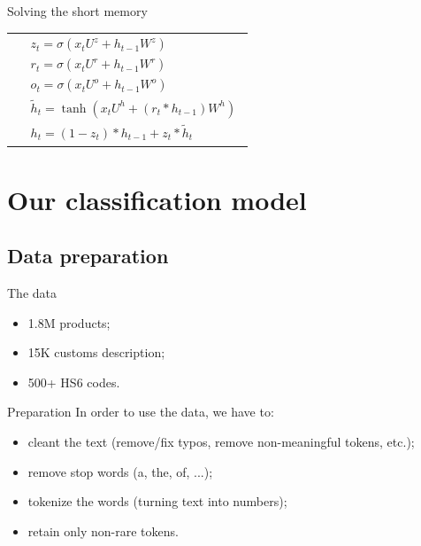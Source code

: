 \documentclass[9pt]{beamer}
\begin{document}
\begin{frame}{Solving the short memory}
{\begin{center}
\begin{tabular}{ c  m{5cm} }
				& $$
					\begin{array}{l} 
						z_t = \sigma\left( x_t U^z + h_{t-1} W^z\right) \\
						r_t = \sigma\left( x_t U^r + h_{t-1} W^r\right) \\
						o_t = \sigma\left( x_t U^o + h_{t-1} W^o\right) \\
						\widetilde{h}_t = \tanh \left( x_t U^h +(r_t \ast h_{t-1}) W^h \right)\\
						h_t =  \left( 1-z_t \right) \ast h_{t-1} + z_t \ast \widetilde{h}_t
					\end{array} 
				$$ \\
			\end{tabular}
		\end{center}
	}
	
	
\end{frame}


\section{Our classification model}



\subsection{Data preparation}
\begin{frame}{The data}
	\begin{itemize}
		\item 1.8M products;
		\item 15K customs description;
		\item 500+ HS6 codes.
	\end{itemize}
\end{frame}

\begin{frame}{Preparation}
	In order to use the data, we have to:
	\begin{itemize}
		\item cleant the text (remove/fix typos, remove non-meaningful tokens, etc.);
		\item remove stop words (a, the, of, ...);
		\item tokenize the words (turning text into numbers);
		\item retain only non-rare tokens.
	\end{itemize}
\end{frame}
\end{document}
